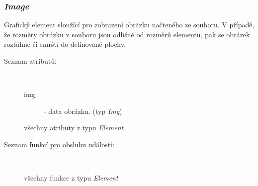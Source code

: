 \documentclass{article}
\begin{document}
\subsubsection{\textit{Image}}
Grafický element sloužící pro zobrazení obrázku načteného ze souboru. V případě, že rozměry obrázku v souboru jsou odlišné od rozměrů elementu, pak se obrázek roztáhne či smrští do definované plochy.\\
\begin{description}
\item[Seznam atributů:] ~
\begin{description}
\item[img] - data obrázku. (typ \textit{Img})
\item[všechny atributy z typu \textit{Element}]
\end{description}
\item[Seznam funkcí pro obsluhu událostí:] ~
\begin{description}
\item[všechny funkce z typu \textit{Element}]
\end{description}
\end{description}
\end{document}
